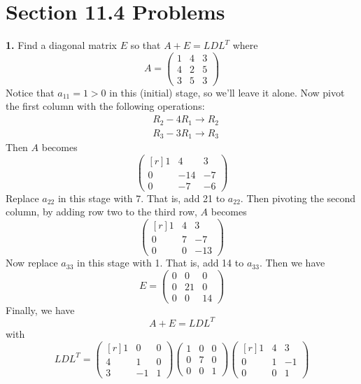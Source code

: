 \documentclass{article}
\begin{document}
\section*{Section 11.4 Problems}
\textbf{1.} Find a diagonal matrix $E$ so that $A + E = LDL^T$ where 
\[A = \begin{pmatrix}
    1 & 4 & 3\\
    4 & 2 & 5\\
    3 & 5 & 3
\end{pmatrix}\]
\newline
Notice that $a_{11} = 1 > 0$ in this (initial) stage, so we'll leave it alone. Now pivot the first column with the following operations:
\begin{align*}
    &R_2 - 4R_1 \to R_2\\
    &R_3 - 3R_1 \to R_3
\end{align*}
Then $A$ becomes
\[\begin{pmatrix*}[r]
    1 & 4 & 3\\
    0 & -14 & -7\\
    0 & -7 & -6
\end{pmatrix*}\]
Replace $a_{22}$ in this stage with $7$. That is, add 21 to $a_{22}$. Then pivoting the second column, by adding row two to the third row, $A$ becomes
\[\begin{pmatrix*}[r]
    1 & 4 & 3\\
    0 & 7 & -7\\
    0 & 0 & -13
\end{pmatrix*}\]
Now replace $a_{33}$ in this stage with 1. That is, add 14 to $a_{33}$. Then we have 
\[E = \begin{pmatrix}
    0 & 0 & 0\\
    0 & 21 & 0\\
    0 & 0 & 14
\end{pmatrix}\]
Finally, we have
\[A + E = LDL^T\]
with
\[LDL^T = \begin{pmatrix*}[r]
    1 & 0 & 0\\
    4 & 1 & 0\\
    3 & -1 & 1
\end{pmatrix*}\begin{pmatrix}
    1 & 0 & 0\\
    0 & 7 & 0\\
    0 & 0 & 1
\end{pmatrix}\begin{pmatrix*}[r]
    1 & 4 & 3\\
    0 & 1 & -1\\
    0 & 0 & 1
\end{pmatrix*}\]
\end{document}
